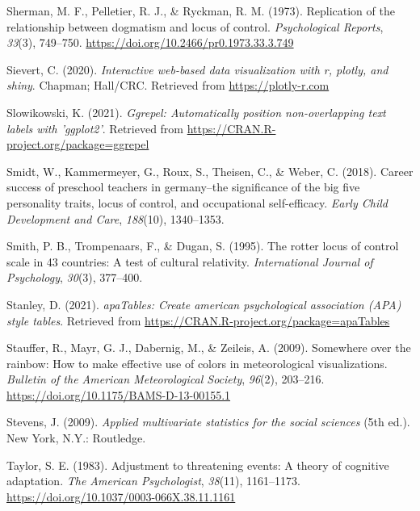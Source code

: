 \documentclass[
  man]{apa6}
\newlength{\cslhangindent}
\newlength{\cslentryspacingunit} %
\newenvironment{CSLReferences}[2] %
 {%
  \setlength{\parindent}{0pt}
  \ifodd #1
  \let\oldpar\par
  \def\par{\hangindent=\cslhangindent\oldpar}
  \fi
  \setlength{\parskip}{#2\cslentryspacingunit}
 }%
 {}
\begin{document}
\begin{CSLReferences}{1}{0}
\leavevmode{}%
Sherman, M. F., Pelletier, R. J., \& Ryckman, R. M. (1973). Replication of the relationship between dogmatism and locus of control. \emph{Psychological Reports}, \emph{33}(3), 749--750. \url{https://doi.org/10.2466/pr0.1973.33.3.749}

\leavevmode{}%
Sievert, C. (2020). \emph{Interactive web-based data visualization with r, plotly, and shiny}. Chapman; Hall/CRC. Retrieved from \url{https://plotly-r.com}

\leavevmode{}%
Slowikowski, K. (2021). \emph{Ggrepel: Automatically position non-overlapping text labels with 'ggplot2'}. Retrieved from \url{https://CRAN.R-project.org/package=ggrepel}

\leavevmode{}%
Smidt, W., Kammermeyer, G., Roux, S., Theisen, C., \& Weber, C. (2018). Career success of preschool teachers in germany--the significance of the big five personality traits, locus of control, and occupational self-efficacy. \emph{Early Child Development and Care}, \emph{188}(10), 1340--1353.

\leavevmode{}%
Smith, P. B., Trompenaars, F., \& Dugan, S. (1995). The rotter locus of control scale in 43 countries: A test of cultural relativity. \emph{International Journal of Psychology}, \emph{30}(3), 377--400.

\leavevmode{}%
Stanley, D. (2021). \emph{apaTables: Create american psychological association (APA) style tables}. Retrieved from \url{https://CRAN.R-project.org/package=apaTables}

\leavevmode{}%
Stauffer, R., Mayr, G. J., Dabernig, M., \& Zeileis, A. (2009). Somewhere over the rainbow: How to make effective use of colors in meteorological visualizations. \emph{Bulletin of the American Meteorological Society}, \emph{96}(2), 203--216. \url{https://doi.org/10.1175/BAMS-D-13-00155.1}

\leavevmode{}%
Stevens, J. (2009). \emph{Applied multivariate statistics for the social sciences} (5th ed.). New York, N.Y.: Routledge.

\leavevmode{}%
Taylor, S. E. (1983). Adjustment to threatening events: A theory of cognitive adaptation. \emph{The American Psychologist}, \emph{38}(11), 1161--1173. \url{https://doi.org/10.1037/0003-066X.38.11.1161}


\end{CSLReferences}
\end{document}
